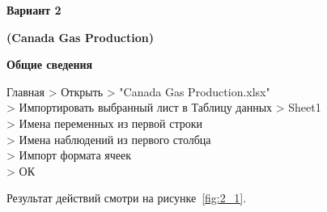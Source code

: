 
\newpage

{}

\begin{center}
  \textbf{Вариант 2}
\end{center}


\begin{center}
  \textbf{(Canada Gas Production)}
\end{center}

\begin{center}
  \textbf{Общие сведения}
\end{center}

Главная > Открыть > "Canada Gas Production.xlsx"\\
> Импортировать выбранный лист в Таблицу данных
> Sheet1\\
> Имена переменных из первой строки\\
> Имена наблюдений из первого столбца\\
> Импорт формата ячеек\\
> ОК

Результат действий смотри на рисунке~\ref{fig:2_1}.

